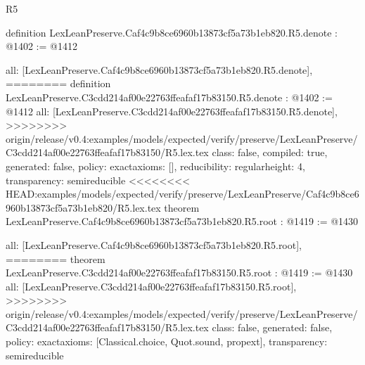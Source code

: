 \begin{lexlean}{R5}
\begin{coremodule}
{{{{{{{{{{{definition LexLeanPreserve.Caf4c9b8ce6960b13873cf5a73b1eb820.R5.denote : @1402 := @1412 {
  all: [LexLeanPreserve.Caf4c9b8ce6960b13873cf5a73b1eb820.R5.denote],
========
definition LexLeanPreserve.C3cdd214af00e22763ffeafaf17b83150.R5.denote : @1402 := @1412 {
  all: [LexLeanPreserve.C3cdd214af00e22763ffeafaf17b83150.R5.denote],
>>>>>>>> origin/release/v0.4:examples/models/expected/verify/preserve/LexLeanPreserve/C3cdd214af00e22763ffeafaf17b83150/R5.lex.tex
  class: false,
  compiled: true,
  generated: false,
  policy: exact{axioms: []},
  reducibility: regular{height: 4},
  transparency: semireducible
}
<<<<<<<< HEAD:examples/models/expected/verify/preserve/LexLeanPreserve/Caf4c9b8ce6960b13873cf5a73b1eb820/R5.lex.tex
theorem LexLeanPreserve.Caf4c9b8ce6960b13873cf5a73b1eb820.R5.root : @1419 := @1430 {
  all: [LexLeanPreserve.Caf4c9b8ce6960b13873cf5a73b1eb820.R5.root],
========
theorem LexLeanPreserve.C3cdd214af00e22763ffeafaf17b83150.R5.root : @1419 := @1430 {
  all: [LexLeanPreserve.C3cdd214af00e22763ffeafaf17b83150.R5.root],
>>>>>>>> origin/release/v0.4:examples/models/expected/verify/preserve/LexLeanPreserve/C3cdd214af00e22763ffeafaf17b83150/R5.lex.tex
  class: false,
  generated: false,
  policy: exact{axioms: [Classical.choice, Quot.sound, propext]},
  transparency: semireducible
}

}}}}}}}}}}}}}
\end{coremodule}
\end{lexlean}
